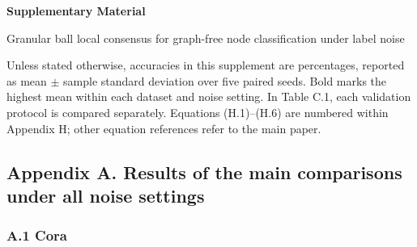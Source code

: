 \textbf{Supplementary Material}

Granular ball local consensus for graph-free node classification under label noise

Unless stated otherwise, accuracies in this supplement are percentages, reported as mean \(\pm\) sample standard deviation over five paired seeds. Bold marks the highest mean within each dataset and noise setting. In Table C.1, each validation protocol is compared separately. Equations (H.1)--(H.6) are numbered within Appendix H; other equation references refer to the main paper.

\subsection{Appendix A. Results of the main comparisons under all noise settings}\label{appendix-a.-results-of-the-main-comparisons-under-all-noise-settings}

\subsubsection{A.1 Cora}\label{a.1-cora}

